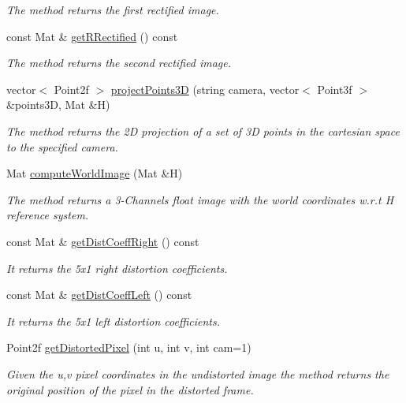 \begin{DoxyCompactItemize}
\begin{DoxyCompactList}\small\item\em The method returns the first rectified image. \end{DoxyCompactList}\item 
const Mat \& \hyperlink{classStereoCamera_aff19b07a766c01d04ed623a05ef4d67d}{get\+R\+Rectified} () const
\begin{DoxyCompactList}\small\item\em The method returns the second rectified image. \end{DoxyCompactList}\item 
vector$<$ Point2f $>$ \hyperlink{classStereoCamera_a03406c9d31c1b765a8d6ef9641222309}{project\+Points3D} (string camera, vector$<$ Point3f $>$ \&points3D, Mat \&H)
\begin{DoxyCompactList}\small\item\em The method returns the 2D projection of a set of 3D points in the cartesian space to the specified camera. \end{DoxyCompactList}\item 
Mat \hyperlink{classStereoCamera_a52ef2f3401488e5c4fa6badd1336f96d}{compute\+World\+Image} (Mat \&H)
\begin{DoxyCompactList}\small\item\em The method returns a 3-\/\+Channels float image with the world coordinates w.\+r.\+t H reference system. \end{DoxyCompactList}\item 
const Mat \& \hyperlink{classStereoCamera_a589ca8eb4ebfc4377589a77bb15b85b7}{get\+Dist\+Coeff\+Right} () const
\begin{DoxyCompactList}\small\item\em It returns the 5x1 right distortion coefficients. \end{DoxyCompactList}\item 
const Mat \& \hyperlink{classStereoCamera_af9e52f941837f0db26d150d0ca4ff3bc}{get\+Dist\+Coeff\+Left} () const
\begin{DoxyCompactList}\small\item\em It returns the 5x1 left distortion coefficients. \end{DoxyCompactList}\item 
Point2f \hyperlink{classStereoCamera_af64550bb8a7a665930dee5eea87b7e47}{get\+Distorted\+Pixel} (int u, int v, int cam=1)
\begin{DoxyCompactList}\small\item\em Given the u,v pixel coordinates in the undistorted image the method returns the original position of the pixel in the distorted frame. \end{DoxyCompactList}\item 

\end{DoxyCompactItemize}

